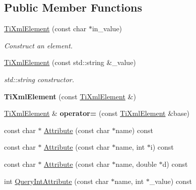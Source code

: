 \subsection*{Public Member Functions}
\begin{DoxyCompactItemize}
\item 
\hypertarget{class_ti_xml_element_a01bc3ab372d35da08efcbbe65ad90c60}{}\label{class_ti_xml_element_a01bc3ab372d35da08efcbbe65ad90c60} 
\hyperlink{class_ti_xml_element_a01bc3ab372d35da08efcbbe65ad90c60}{Ti\+Xml\+Element} (const char $\ast$in\+\_\+value)
\begin{DoxyCompactList}\small\item\em Construct an element. \end{DoxyCompactList}\item 
\hypertarget{class_ti_xml_element_a40fc2e3c1a955e2f78e1a32350d180e7}{}\label{class_ti_xml_element_a40fc2e3c1a955e2f78e1a32350d180e7} 
\hyperlink{class_ti_xml_element_a40fc2e3c1a955e2f78e1a32350d180e7}{Ti\+Xml\+Element} (const std\+::string \&\+\_\+value)
\begin{DoxyCompactList}\small\item\em std\+::string constructor. \end{DoxyCompactList}\item 
\hypertarget{class_ti_xml_element_a1ca4465f3c2eac6a60e641cd7f1d9f7e}{}\label{class_ti_xml_element_a1ca4465f3c2eac6a60e641cd7f1d9f7e} 
{\bfseries Ti\+Xml\+Element} (const \hyperlink{class_ti_xml_element}{Ti\+Xml\+Element} \&)
\item 
\hypertarget{class_ti_xml_element_ad58d300f4cfc0016ffa6861ebb718a0b}{}\label{class_ti_xml_element_ad58d300f4cfc0016ffa6861ebb718a0b} 
\hyperlink{class_ti_xml_element}{Ti\+Xml\+Element} \& {\bfseries operator=} (const \hyperlink{class_ti_xml_element}{Ti\+Xml\+Element} \&base)
\item 
const char $\ast$ \hyperlink{class_ti_xml_element_a6042f518748f475a7ac4b4e0b509eb05}{Attribute} (const char $\ast$name) const
\item 
const char $\ast$ \hyperlink{class_ti_xml_element_a8005d0b808fd02bd1246710cdf95e5f6}{Attribute} (const char $\ast$name, int $\ast$i) const
\item 
const char $\ast$ \hyperlink{class_ti_xml_element_a09df893402d0ab1402c8725e6d30ec04}{Attribute} (const char $\ast$name, double $\ast$d) const
\item 
int \hyperlink{class_ti_xml_element_a5c0f739e0f6f5905a201364532e54a60}{Query\+Int\+Attribute} (const char $\ast$name, int $\ast$\+\_\+value) const

\end{DoxyCompactItemize}
